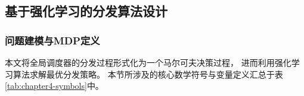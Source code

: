 



\subsection{基于强化学习的分发算法设计}\label{sec:rl-dispatch}

\subsubsection{问题建模与MDP定义}\label{subsec:mdp}

本文将全局调度器的分发过程形式化为一个马尔可夫决策过程，
进而利用强化学习算法求解最优分发策略。
本节所涉及的核心数学符号与变量定义汇总于表\ref{tab:chapter4-symbols}中。

